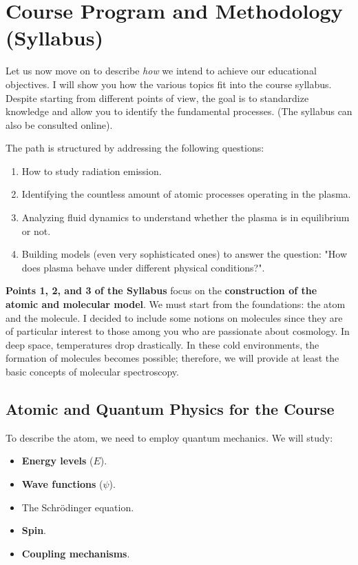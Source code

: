 \section{Course Program and Methodology (Syllabus)}

Let us now move on to describe \textit{how} we intend to achieve our educational objectives. I will show you how the various topics fit into the course syllabus. Despite starting from different points of view, the goal is to standardize knowledge and allow you to identify the fundamental processes. (The syllabus can also be consulted online).

The path is structured by addressing the following questions:
\begin{enumerate}
    \item How to study radiation emission.
    \item Identifying the countless amount of atomic processes operating in the plasma.
    \item Analyzing fluid dynamics to understand whether the plasma is in equilibrium or not.
    \item Building models (even very sophisticated ones) to answer the question: "How does plasma behave under different physical conditions?".
\end{enumerate}

\textbf{Points 1, 2, and 3 of the Syllabus} focus on the \textbf{construction of the atomic and molecular model}.
We must start from the foundations: the atom and the molecule. I decided to include some notions on molecules since they are of particular interest to those among you who are passionate about cosmology. In deep space, temperatures drop drastically. In these cold environments, the formation of molecules becomes possible; therefore, we will provide at least the basic concepts of molecular spectroscopy.

    \subsection{Atomic and Quantum Physics for the Course}
    
    To describe the atom, we need to employ quantum mechanics. We will study:
    \begin{itemize}
        \item \textbf{Energy levels} ($E$).
        \item \textbf{Wave functions} ($\psi$).
        \item The Schrödinger equation.
        \item \textbf{Spin}.
        \item \textbf{Coupling mechanisms}.
    \end{itemize}
    
